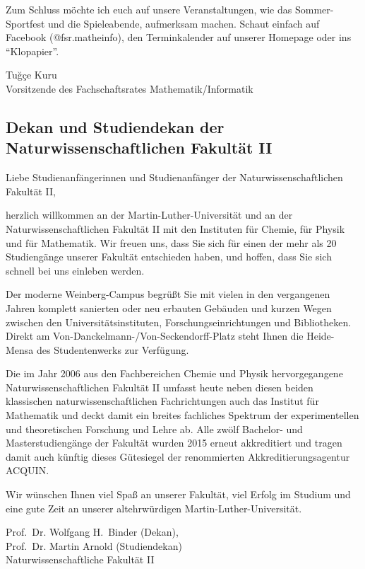 Zum Schluss möchte ich euch 
auf unsere Veranstaltungen,
wie das Sommer-Sportfest und die Spieleabende,
aufmerksam machen.
Schaut einfach auf Facebook (@fsr.matheinfo),
den Terminkalender auf unserer Homepage
oder ins \enquote{Klopapier}.

Tuğçe Kuru \\
Vorsitzende des Fachschaftsrates Mathematik/Informatik


\subsection*{Dekan und Studiendekan der Naturwissenschaftlichen Fakultät II}

Liebe Studienanfängerinnen und Studienanfänger der Naturwissenschaftlichen
Fakultät II,

herzlich willkommen an der Martin-Luther-Universität und an der
Naturwissenschaftlichen Fakultät II mit den Instituten für Chemie, für Physik
und für Mathematik. Wir freuen uns, dass Sie sich für einen der mehr als 20
Studiengänge unserer Fakultät entschieden haben, und hoffen, dass Sie sich
schnell bei uns einleben werden.

Der moderne Weinberg-Campus begrüßt Sie mit vielen in den vergangenen Jahren
komplett sanierten oder neu erbauten Gebäuden und kurzen Wegen zwischen den
Universitätsinstituten, Forschungseinrichtungen und Bibliotheken. Direkt am
Von-Danckelmann-/Von-Seckendorff-Platz steht Ihnen die Heide-Mensa des
Studentenwerks zur Verfügung.

Die im Jahr 2006 aus den Fachbereichen Chemie und Physik hervorgegangene
Naturwissenschaftlichen Fakultät II umfasst heute neben diesen beiden
klassischen naturwissenschaftlichen Fachrichtungen auch das Institut für
Mathematik und deckt damit ein breites fachliches Spektrum der experimentellen
und theoretischen Forschung und Lehre ab. Alle zwölf Bachelor- und
Masterstudiengänge der Fakultät wurden 2015 erneut
akkreditiert und tragen damit auch künftig dieses Gütesiegel der renommierten
Akkreditierungsagentur ACQUIN.

Wir wünschen Ihnen viel Spaß an unserer Fakultät, viel Erfolg im Studium und
eine gute Zeit an unserer altehrwürdigen Martin-Luther-Universität.

Prof.~Dr. Wolfgang H.~Binder (Dekan), \\
Prof.~Dr. Martin Arnold (Studiendekan) \\
Naturwissenschaftliche Fakultät II 

\newpage

